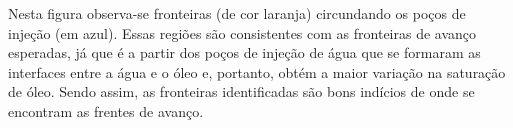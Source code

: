 	Nesta figura observa-se fronteiras (de cor laranja) circundando os poços de injeção (em azul). Essas regiões são consistentes com as fronteiras de avanço esperadas, já que é a partir dos poços de injeção de água que se formaram as interfaces entre a água e o óleo e, portanto, obtém a maior variação na saturação de óleo. Sendo assim, as fronteiras identificadas são bons indícios de onde se encontram as frentes de avanço.